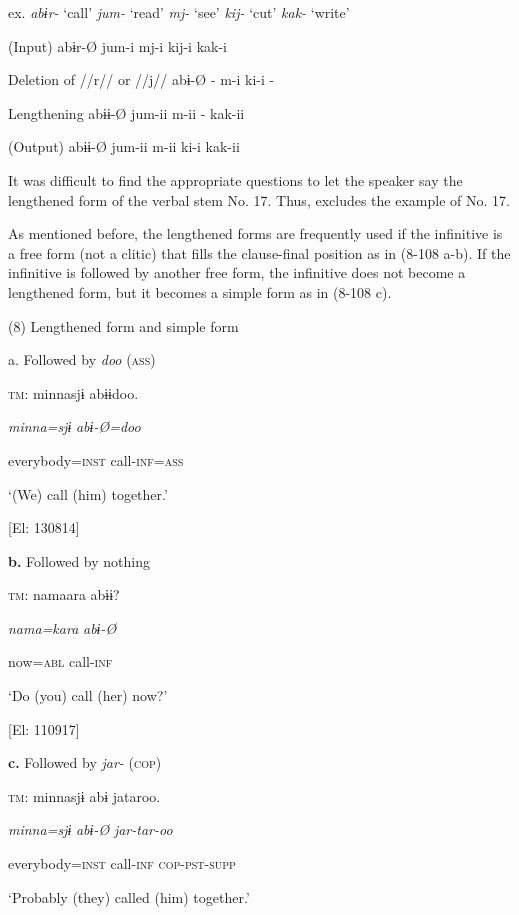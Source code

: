 ex.  \textit{abɨr-} ‘call’  \textit{jum-} ‘read’  \textit{mj-} ‘see’  \textit{kij-} ‘cut’  \textit{kak-} ‘write’

(Input)  abɨr-Ø  jum-i  mj-i  kij-i  kak-i

Deletion of //r// or //j//  abɨ-Ø  {}-  m-i  ki-i  {}-

Lengthening  abɨɨ-Ø  jum-ii  m-ii  {}-  kak-ii

(Output)  abɨɨ-Ø  jum-ii  m-ii  ki-i  kak-ii

It was difficult to find the appropriate questions to let the speaker say the lengthened form of the verbal stem No. 17. Thus,  excludes the example of No. 17. 

As mentioned before, the lengthened forms are frequently used if the infinitive is a free form (not a clitic) that fills the clause-final position as in (8-108 a-b). If the infinitive is followed by another free form, the infinitive does not become a lengthened form, but it becomes a simple form as in (8-108 c).

(8)  Lengthened form and simple form

  a.  Followed by \textit{doo} (\textsc{ass})

    \textsc{tm}:  minnasjɨ  abɨɨdoo.

      \textit{minna=sjɨ}  \textit{abɨ-Ø=doo}

      everybody=\textsc{inst}  call-\textsc{inf}=\textsc{ass}

      ‘(We) call (him) together.’

      [El: 130814]

  \textbf{b.}  Followed by nothing

    \textsc{tm}:  namaara  abɨɨ?

      \textit{nama=kara}  \textit{abɨ{}-Ø} 

      now=\textsc{abl}  call-\textsc{inf}

      ‘Do (you) call (her) now?’

      [El: 110917]

  \textbf{c.}  Followed by \textit{jar-} (\textsc{cop})

    \textsc{tm}:  minnasjɨ  abɨ  jataroo.

      \textit{minna=sjɨ}  \textit{abɨ-Ø}  \textit{jar-tar-oo}

      everybody=\textsc{inst}  call-\textsc{inf}  \textsc{cop}-\textsc{pst}-\textsc{supp}

      ‘Probably (they) called (him) together.’

